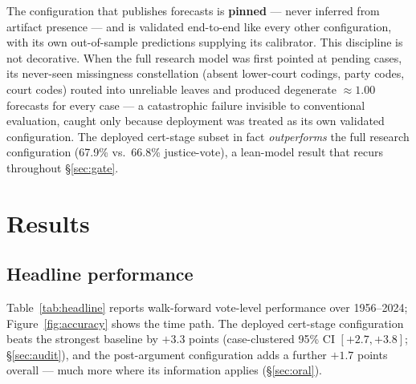 \documentclass[11pt]{article}
\begin{document}
The configuration that publishes forecasts is \textbf{pinned} --- never inferred
from artifact presence --- and is validated end-to-end like every other
configuration, with its own out-of-sample predictions supplying its calibrator.
This discipline is not decorative. When the full research model was first
pointed at pending cases, its never-seen missingness constellation (absent
lower-court codings, party codes, court codes) routed into unreliable leaves
and produced degenerate $\approx 1.00$ forecasts for every case --- a
catastrophic failure invisible to conventional evaluation, caught only because
deployment was treated as its own validated configuration. The deployed
cert-stage subset in fact \emph{outperforms} the full research configuration
(67.9\% vs.\ 66.8\% justice-vote), a lean-model result that recurs throughout
\S\ref{sec:gate}.

\section{Results}\label{sec:results}

\subsection{Headline performance}

Table~\ref{tab:headline} reports walk-forward vote-level performance over
1956--2024; Figure~\ref{fig:accuracy} shows the time path. The deployed
cert-stage configuration beats the strongest baseline by $+3.3$ points
(case-clustered 95\% CI $[+2.7, +3.8]$; \S\ref{sec:audit}), and the
post-argument configuration adds a further $+1.7$ points overall --- much more
where its information applies (\S\ref{sec:oral}).
\end{document}
